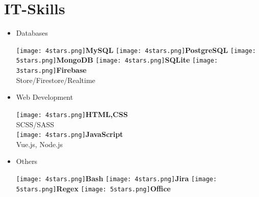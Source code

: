 \documentclass[]{friggeri-cv}
\begin{document}
\section{IT-Skills}
        \vspace*{-0.45cm}
        \setlength{\columnsep}{-0.3cm}
        \begin{flushleft}
        \begin{multicols}{3}
		\begin{itemize}
		
		\setlength{\itemsep}{5pt}
  		\setlength{\parskip}{0pt}
  		\setlength{\parsep}{0pt}
          
        
\item \large Databases \
\normalsize
\begin{flushleft}

\texttt{[image: 4stars.png]}\hspace{1.5mm}\textbf{MySQL}
\texttt{[image: 4stars.png]}\hspace{1.5mm}\textbf{PostgreSQL}
\texttt{[image: 5stars.png]}\hspace{1.5mm}\textbf{MongoDB}
\texttt{[image: 4stars.png]}\hspace{1.5mm}\textbf{SQLite}
\texttt{[image: 3stars.png]}\hspace{1.5mm}\textbf{Firebase}\\Store/Firestore/Realtime\\
\end{flushleft}            

\item \large Web Development \
\normalsize
\begin{flushleft}

\texttt{[image: 4stars.png]}\hspace{1.5mm}\textbf{HTML,CSS}\\SCSS/SASS\\
\texttt{[image: 4stars.png]}\hspace{1.5mm}\textbf{JavaScript}\\Vue.js, Node.js\\
\end{flushleft}            

\item \large Others \
\normalsize
\begin{flushleft}

\texttt{[image: 4stars.png]}\hspace{1.5mm}\textbf{Bash}
\texttt{[image: 4stars.png]}\hspace{1.5mm}\textbf{Jira}
\texttt{[image: 5stars.png]}\hspace{1.5mm}\textbf{Regex}
\texttt{[image: 5stars.png]}\hspace{1.5mm}\textbf{Office}
\end{flushleft}            


\end{itemize}
\end{multicols}
\end{flushleft}
\end{document}
